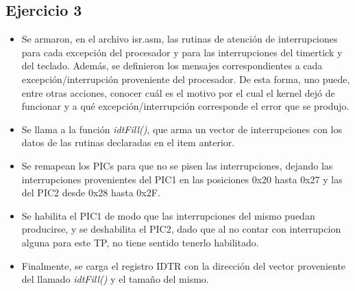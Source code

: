 \vspace{22pt}

\subsection{Ejercicio 3}
\begin{itemize}
 \item Se armaron, en el archivo isr.asm, las rutinas de atenci\'on de interrupciones para cada excepci\'on del procesador y para las interrupciones del timertick y del teclado. Adem\'as, se definieron los mensajes correspondientes a cada excepci\'on/interrupci\'on proveniente del procesador. De esta forma, uno puede, entre otras acciones, conocer cu\'al es el motivo por el cual el kernel dej\'o de funcionar y a qu\'e excepci\'on/interrupci\'on corresponde el error que se produjo.
 \item Se llama a la funci\'on \textit{idtFill()}, que arma un vector de interrupciones con los datos de las rutinas declaradas en el item anterior.
 \item Se remapean los PICs para que no se pisen las interrupciones, dejando las interrupciones provenientes del PIC1 en las posiciones 0x20 hasta 0x27 y las del PIC2 desde 0x28 hasta 0x2F.
\item Se habilita el PIC1 de modo que las interrupciones del mismo puedan producirse, y se deshabilita el PIC2, dado que al no contar con interrupcion alguna para este TP, no tiene sentido tenerlo habilitado.
 \item Finalmente, se carga el registro IDTR con la direcci\'on del vector proveniente del llamado \textit{idtFill()} y el tama\~no del mismo.
\end{itemize}

\vspace{22pt}

